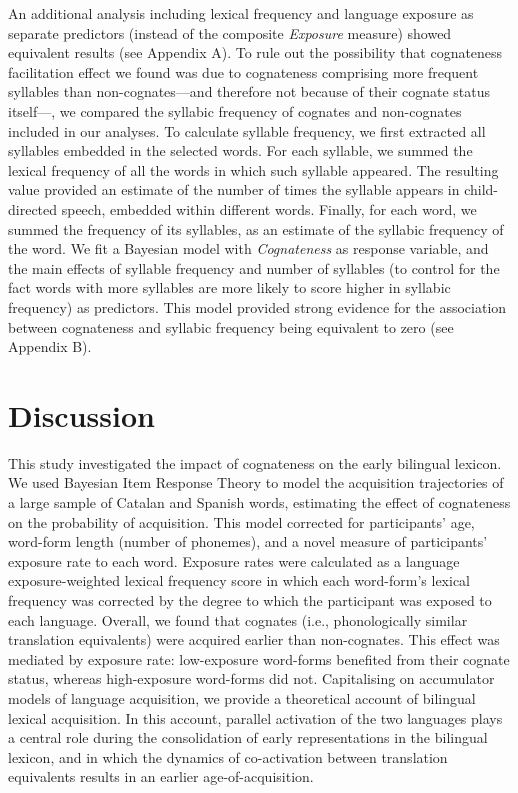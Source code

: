 \documentclass[
]{article}
\begin{document}
An additional analysis including lexical frequency and language exposure
as separate predictors (instead of the composite \emph{Exposure}
measure) showed equivalent results (see Appendix A). To rule out the
possibility that cognateness facilitation effect we found was due to
cognateness comprising more frequent syllables than non-cognates---and
therefore not because of their cognate status itself---, we compared the
syllabic frequency of cognates and non-cognates included in our
analyses. To calculate syllable frequency, we first extracted all
syllables embedded in the selected words. For each syllable, we summed
the lexical frequency of all the words in which such syllable appeared.
The resulting value provided an estimate of the number of times the
syllable appears in child-directed speech, embedded within different
words. Finally, for each word, we summed the frequency of its syllables,
as an estimate of the syllabic frequency of the word. We fit a Bayesian
model with \emph{Cognateness} as response variable, and the main effects
of syllable frequency and number of syllables (to control for the fact
words with more syllables are more likely to score higher in syllabic
frequency) as predictors. This model provided strong evidence for the
association between cognateness and syllabic frequency being equivalent
to zero (see Appendix B).

\hypertarget{sec-discussion}{%
\section{Discussion}\label{sec-discussion}}

This study investigated the impact of cognateness on the early bilingual
lexicon. We used Bayesian Item Response Theory to model the acquisition
trajectories of a large sample of Catalan and Spanish words, estimating
the effect of cognateness on the probability of acquisition. This model
corrected for participants' age, word-form length (number of phonemes),
and a novel measure of participants' exposure rate to each word.
Exposure rates were calculated as a language exposure-weighted lexical
frequency score in which each word-form's lexical frequency was
corrected by the degree to which the participant was exposed to each
language. Overall, we found that cognates (i.e., phonologically similar
translation equivalents) were acquired earlier than non-cognates. This
effect was mediated by exposure rate: low-exposure word-forms benefited
from their cognate status, whereas high-exposure word-forms did not.
Capitalising on accumulator models of language acquisition, we provide a
theoretical account of bilingual lexical acquisition. In this account,
parallel activation of the two languages plays a central role during the
consolidation of early representations in the bilingual lexicon, and in
which the dynamics of co-activation between translation equivalents
results in an earlier age-of-acquisition.
\end{document}
